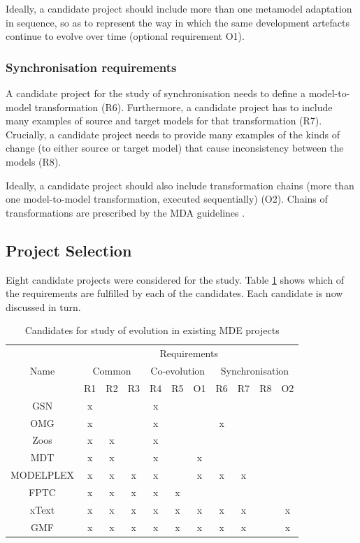 Ideally, a candidate project should include more than one metamodel adaptation in sequence, so as to represent the way in which the same development artefacts continue to evolve over time (optional requirement O1).

\subsubsection{Synchronisation requirements}
A candidate project for the study of synchronisation needs to define a model-to-model transformation (R6). Furthermore, a candidate project has to include many examples of source and target models for that transformation (R7). Crucially, a candidate project needs to provide many examples of the kinds of change (to either source or target model) that cause inconsistency between the models (R8). 

Ideally, a candidate project should also include transformation chains (more than one model-to-model transformation, executed sequentially) (O2). Chains of transformations are prescribed by the MDA guidelines \cite{kleppe03mda}.


\subsection{Project Selection}
\label{subsec:project_selection}
Eight candidate projects were considered for the study. Table \ref{tab:candidates} shows which of the requirements are fulfilled by each of the candidates. Each candidate is now discussed in turn.

\begin{table}
	\caption{Candidates for study of evolution in existing MDE projects}
	\centering
	\begin{tabular}{|c||c|c|c||c|c|c||c|c|c|c|}
		\hline
		\multirow{3}{*}{Name} & \multicolumn{10}{|c|}{Requirements} \\
		\cline{2-11}
		          & \multicolumn{3}{|c||}{Common} & \multicolumn{3}{|c||}{Co-evolution} & \multicolumn{4}{|c|}{Synchronisation} \\
		\cline{2-11}
		          & R1 & R2 & R3 & R4 & R5 & O1 & R6 & R7 & R8 & O2 \\
		\hline
		GSN       & x  &    &    & x  &    &    &    &    &    &    \\
		\hline
		OMG       & x  &    &    & x  &    &    & x  &    &    &    \\
		\hline
		Zoos      & x  & x  &    & x  &    &    &    &    &    &    \\
		\hline
		MDT       & x  & x  &    & x  &    & x  &    &    &    &    \\
		\hline
		MODELPLEX & x  & x  & x  & x  &    & x  & x  & x  &    &    \\
		\hline
		FPTC      & x  & x  & x  & x  & x  &    &    &    &    &    \\
		\hline
		xText     & x  & x  & x  & x  & x  & x  & x  & x  &    & x  \\
		\hline
		GMF       & x  & x  & x  & x  & x  & x  & x  & x  &    & x  \\
		\hline
	\end{tabular}
	\label{tab:candidates}
\end{table}


